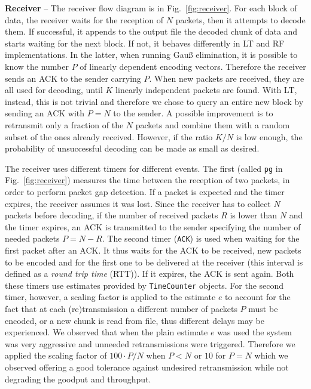 \textbf{Receiver} -- The receiver flow diagram is in Fig.~\ref{fig:receiver}. 
For each block of data, the receiver waits for the reception of $N$ packets, then it attempts to decode them. If successful, it appends to the output file the decoded chunk of data and starts waiting for the next block. If not, it behaves differently in LT and RF implementations. In the latter, when running Gau{\ss} elimination, it is possible to know the number $P$ of linearly dependent encoding vectors. Therefore the receiver sends an ACK to the sender carrying $P$. When new packets are received, they are all used for decoding, until $K$ linearly independent packets are found. 
With LT, instead, this is not trivial and therefore we chose to query an entire new block by sending an ACK with $P=N$ to the sender. A possible improvement is to retransmit only a fraction of the $N$ packets and combine them with a random subset of the ones already received. However, if the ratio $K/N$ is low enough, the probability of unsuccessful decoding can be made as small as desired. 

The receiver uses different timers for different events. The first (called \texttt{pg} in Fig.~\ref{fig:receiver}) measures the time between the reception of two packets, in order to perform packet gap detection. If a packet is expected and the timer expires, the receiver assumes it was lost. Since the receiver has to collect $N$ packets before decoding, if the number of received packets $R$ is lower than $N$ and the timer expires, an ACK is transmitted to the sender specifying the number of needed packets $P = N - R$. The second timer (\texttt{ACK}) is used when waiting for the first packet after an ACK. It thus waits for the ACK to be received, new packets to be encoded and for the first one to be delivered at the receiver (this interval is defined as a \textit{round trip time} (RTT)). If it expires, the ACK is sent again. Both these timers use estimates provided by \texttt{TimeCounter} objects. For the second timer, however, a scaling factor is applied to the estimate $e$ to account for the fact that at each (re)transmission a different number of packets $P$ must be encoded, or a new chunk is read from file, thus different delays may be experienced. We observed that when the plain estimate $e$ was used the system was very aggressive and unneeded retransmissions were triggered. Therefore we applied the scaling factor of $100 \cdot P / N$ when $P < N$ or $10$ for $P = N$ which we observed offering a good tolerance against undesired retransmission while not degrading the goodput and throughput.

